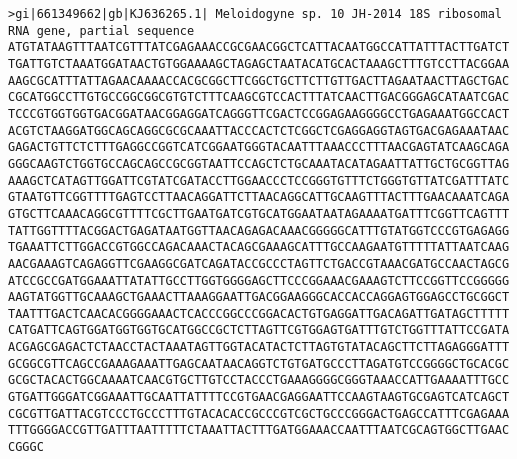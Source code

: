 \documentclass[11pt]{article}
\begin{document}
\begin{Verbatim}[commandchars=\\\{\}]
>gi|661349662|gb|KJ636265.1| Meloidogyne sp. 10 JH-2014 18S ribosomal RNA gene, partial sequence
ATGTATAAGTTTAATCGTTTATCGAGAAACCGCGAACGGCTCATTACAATGGCCATTATTTACTTGATCT
TGATTGTCTAAATGGATAACTGTGGAAAAGCTAGAGCTAATACATGCACTAAAGCTTTGTCCTTACGGAA
AAGCGCATTTATTAGAACAAAACCACGCGGCTTCGGCTGCTTCTTGTTGACTTAGAATAACTTAGCTGAC
CGCATGGCCTTGTGCCGGCGGCGTGTCTTTCAAGCGTCCACTTTATCAACTTGACGGGAGCATAATCGAC
TCCCGTGGTGGTGACGGATAACGGAGGATCAGGGTTCGACTCCGGAGAAGGGGCCTGAGAAATGGCCACT
ACGTCTAAGGATGGCAGCAGGCGCGCAAATTACCCACTCTCGGCTCGAGGAGGTAGTGACGAGAAATAAC
GAGACTGTTCTCTTTGAGGCCGGTCATCGGAATGGGTACAATTTAAACCCTTTAACGAGTATCAAGCAGA
GGGCAAGTCTGGTGCCAGCAGCCGCGGTAATTCCAGCTCTGCAAATACATAGAATTATTGCTGCGGTTAG
AAAGCTCATAGTTGGATTCGTATCGATACCTTGGAACCCTCCGGGTGTTTCTGGGTGTTATCGATTTATC
GTAATGTTCGGTTTTGAGTCCTTAACAGGATTCTTAACAGGCATTGCAAGTTTACTTTGAACAAATCAGA
GTGCTTCAAACAGGCGTTTTCGCTTGAATGATCGTGCATGGAATAATAGAAAATGATTTCGGTTCAGTTT
TATTGGTTTTACGGACTGAGATAATGGTTAACAGAGACAAACGGGGGCATTTGTATGGTCCCGTGAGAGG
TGAAATTCTTGGACCGTGGCCAGACAAACTACAGCGAAAGCATTTGCCAAGAATGTTTTTATTAATCAAG
AACGAAAGTCAGAGGTTCGAAGGCGATCAGATACCGCCCTAGTTCTGACCGTAAACGATGCCAACTAGCG
ATCCGCCGATGGAAATTATATTGCCTTGGTGGGGAGCTTCCCGGAAACGAAAGTCTTCCGGTTCCGGGGG
AAGTATGGTTGCAAAGCTGAAACTTAAAGGAATTGACGGAAGGGCACCACCAGGAGTGGAGCCTGCGGCT
TAATTTGACTCAACACGGGGAAACTCACCCGGCCCGGACACTGTGAGGATTGACAGATTGATAGCTTTTT
CATGATTCAGTGGATGGTGGTGCATGGCCGCTCTTAGTTCGTGGAGTGATTTGTCTGGTTTATTCCGATA
ACGAGCGAGACTCTAACCTACTAAATAGTTGGTACATACTCTTAGTGTATACAGCTTCTTAGAGGGATTT
GCGGCGTTCAGCCGAAAGAAATTGAGCAATAACAGGTCTGTGATGCCCTTAGATGTCCGGGGCTGCACGC
GCGCTACACTGGCAAAATCAACGTGCTTGTCCTACCCTGAAAGGGGCGGGTAAACCATTGAAAATTTGCC
GTGATTGGGATCGGAAATTGCAATTATTTTCCGTGAACGAGGAATTCCAAGTAAGTGCGAGTCATCAGCT
CGCGTTGATTACGTCCCTGCCCTTTGTACACACCGCCCGTCGCTGCCCGGGACTGAGCCATTTCGAGAAA
TTTGGGGACCGTTGATTTAATTTTTCTAAATTACTTTGATGGAAACCAATTTAATCGCAGTGGCTTGAAC
CGGGC


\end{Verbatim}
\end{document}
